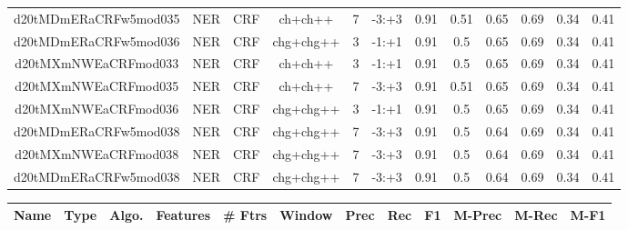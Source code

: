 \documentclass[a4paper]{article}
\begin{document}
\begin{landscape}
\begin{center}
\begin{tabular}{ |c|c|c|c|c|c|c|c|c|c|c|c|}
 
 	
 	\small{ d20tMDmERaCRFw5mod035 } & \small{ NER} & \small{  CRF }  & ch+ch++  &  7 &  \small{  -3:+3 }  &  0.91 & 0.51 & 0.65  &  0.69 & 0.34 & 0.41 \\
 	

 
 	
 	\small{ d20tMDmERaCRFw5mod036 } & \small{ NER} & \small{  CRF }  & chg+chg++  &  3 &  \small{  -1:+1 }  &  0.91 & 0.5 & 0.65  &  0.69 & 0.34 & 0.41 \\
 	

 
 	
 	\small{ d20tMXmNWEaCRFmod033 } & \small{ NER} & \small{  CRF }  & ch+ch++  &  3 &  \small{  -1:+1 }  &  0.91 & 0.5 & 0.65  &  0.69 & 0.34 & 0.41 \\
 	

 
 	
 	\small{ d20tMXmNWEaCRFmod035 } & \small{ NER} & \small{  CRF }  & ch+ch++  &  7 &  \small{  -3:+3 }  &  0.91 & 0.51 & 0.65  &  0.69 & 0.34 & 0.41 \\
 	

 
 	
 	\small{ d20tMXmNWEaCRFmod036 } & \small{ NER} & \small{  CRF }  & chg+chg++  &  3 &  \small{  -1:+1 }  &  0.91 & 0.5 & 0.65  &  0.69 & 0.34 & 0.41 \\
 	

 
 	
 	\small{ d20tMDmERaCRFw5mod038 } & \small{ NER} & \small{  CRF }  & chg+chg++  &  7 &  \small{  -3:+3 }  &  0.91 & 0.5 & 0.64  &  0.69 & 0.34 & 0.41 \\
 	

 
 	
 	\small{ d20tMXmNWEaCRFmod038 } & \small{ NER} & \small{  CRF }  & chg+chg++  &  7 &  \small{  -3:+3 }  &  0.91 & 0.5 & 0.64  &  0.69 & 0.34 & 0.41 \\
 	

 
 	
 	\small{ d20tMDmERaCRFw5mod038 } & \small{ NER} & \small{  CRF }  & chg+chg++  &  7 &  \small{  -3:+3 }  &  0.91 & 0.5 & 0.64  &  0.69 & 0.34 & 0.41 \\
 	
 \hline
\end{tabular}
\end{center}




\begin{center}
\begin{tabular}{ |c|c|c|c|c|c|c|c|c|c|c|c|} 
 \hline
 	Name & Type & Algo. & Features & \# Ftrs & Window & Prec & Rec & F1 & M-Prec & M-Rec & M-F1\\
 \hline


\end{tabular}
\end{center}
\end{landscape}
\end{document}
